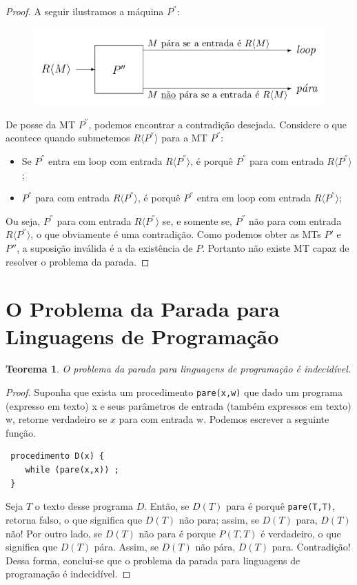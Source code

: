 \documentclass[a4paper]{article}
\newtheorem{Theorem}{Teorema}
\theoremstyle{definition}
\begin{document}
\begin{proof}
    A seguir ilustramos a máquina $P^{''}$:
    \begin{figure}[H]
      \includegraphics[scale=.4]{MTD.png}
      \centering
    \end{figure}
    De posse da MT $P^{''}$, podemos encontrar a contradição desejada. Considere
    o que acontece quando submetemos $R\langle P^{''} \rangle$ para a MT
    $P^{''}$:
    \begin{itemize}
       \item Se $P^{''}$ entra em loop com entrada $R\langle P^{''} \rangle$, é
         porquê $P^{''}$ para com entrada $R\langle P^{''} \rangle$;
       \item $P^{''}$ para com entrada $R\langle P^{''} \rangle$, é
         porquê $P^{''}$ entra em loop com entrada $R\langle P^{''} \rangle$;
    \end{itemize}
    Ou seja, $P^{''}$ para com entrada $R\langle  P^{''} \rangle$ se, e somente
    se,  $P^{''}$ não para com entrada $R\langle  P^{''} \rangle$, o que
    obviamente é uma contradição. Como podemos obter as MTs $P'$ e $P''$, a
    suposição inválida é a da existência de $P$. Portanto não existe MT capaz de
    resolver o problema da parada.
  \end{proof}

  \section{O Problema da Parada para Linguagens de Programação}
  
  \begin{Theorem}
    O problema da parada para linguagens de programação é indecidível.
  \end{Theorem}
  \begin{proof}
    Suponha que exista um procedimento \texttt{pare(x,w)} que dado um programa
    (expresso em texto) x e seus parâmetros de entrada (também expressos em
    texto) w, retorne verdadeiro se $x$ para com entrada w. Podemos escrever a
    seguinte função.
\begin{verbatim}
 procedimento D(x) {
    while (pare(x,x)) ;
 }
\end{verbatim}
    Seja $T$ o texto desse programa $D$. Então, se $D(T)$ para é  porquê
    \texttt{pare(T,T)}, retorna falso, o que significa que $D(T)$ não para;
    assim, se $D(T)$ para, $D(T)$ não! Por outro lado, se $D(T)$ não para é
    porque $P(T,T)$ é verdadeiro, o que significa que $D(T)$ pára. Assim,
    se $D(T)$ não pára, $D(T)$ para. Contradição! Dessa forma, conclui-se que o
    problema da parada para linguagens de programação é indecidível.
  \end{proof}
\end{document}
